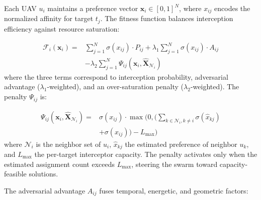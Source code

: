 \documentclass[lettersize,journal]{IEEEtran}
\begin{document}
Each UAV $u_i$ maintains a preference vector $\mathbf{x}_i \in [0,1]^{N}$, where $x_{ij}$ encodes the normalized affinity for target $t_j$. The fitness function balances interception efficiency against resource saturation:

\begin{equation}
\label{eq:idbo_fitness}
\begin{split}
\mathcal{F}_i(\mathbf{x}_i) =& \sum_{j=1}^{N} \sigma(x_{ij}) \cdot P_{ij} + \lambda_1 \sum_{j=1}^{N} \sigma(x_{ij}) \cdot A_{ij} \\
&- \lambda_2 \sum_{j=1}^{N} \Psi_{ij}(\mathbf{x}_i, \hat{\mathbf{X}}_{\mathcal{N}_i})
\end{split}
\end{equation}
where the three terms correspond to interception probability, adversarial advantage ($\lambda_1$-weighted), and an over-saturation penalty ($\lambda_2$-weighted). The penalty $\Psi_{ij}$ is:

\begin{equation}
\label{eq:saturation_penalty}
\begin{split}
\Psi_{ij}(\mathbf{x}_i, \hat{\mathbf{X}}_{\mathcal{N}_i}) =& \sigma(x_{ij}) \cdot \max\Biggl(0, \Biggl(\sum_{k \in \mathcal{N}_i, k \neq i} \sigma(\hat{x}_{kj}) \\
&+ \sigma(x_{ij})\Biggr) - L_{\max}\Biggr)
\end{split}
\end{equation}
where $\mathcal{N}_i$ is the neighbor set of $u_i$, $\hat{x}_{kj}$ the estimated preference of neighbor $u_k$, and $L_{\max}$ the per-target interceptor capacity. The penalty activates only when the estimated assignment count exceeds $L_{\max}$, steering the swarm toward capacity-feasible solutions.

The adversarial advantage $A_{ij}$ fuses temporal, energetic, and geometric factors:
\end{document}
